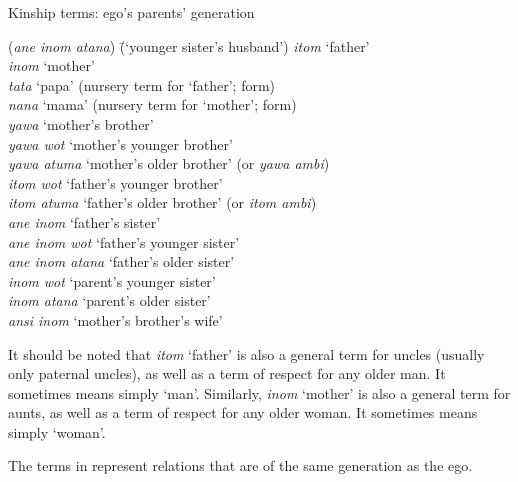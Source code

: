 \ea%
    \label{ex:sem:26}
          Kinship terms: ego’s parents’ generation
\begin{tabbing}
      {(\textit{ane inom atana})} \= {(‘younger sister’s husband’)}\kill
     \textit{itom} \> ‘father’\\
     \textit{inom} \> ‘mother’\\
     \textit{tata} \> ‘papa’ (nursery term for ‘father’;  form)\\
    \textit{nana} \> ‘mama’ (nursery term for ‘mother’;  form)\\
    \textit{yawa} \> ‘mother’s brother’\\
    \textit{yawa wot} \> ‘mother’s younger brother’\\
    \textit{yawa atuma} \> ‘mother’s older brother’ (or \textit{yawa ambi})\\
    \textit{itom wot} \> ‘father’s younger brother’\\
    \textit{itom atuma} \> ‘father’s older brother’ (or \textit{itom ambi})\\
    \textit{ane inom} \> ‘father’s sister’\\
    \textit{ane inom wot} \> ‘father’s younger sister’\\
    \textit{ane inom atana} \> ‘father’s older sister’\\
    \textit{inom wot} \> ‘parent’s younger sister’\\
    \textit{inom atana} \> ‘parent’s older sister’\\
    \textit{ansi inom} \> ‘mother’s brother’s wife’
\end{tabbing}
\z

It should be noted that \textit{itom} ‘father’ is also a general term for uncles (usually only paternal uncles), as well as a term of respect for any older man. It sometimes means simply ‘man’. Similarly, \textit{inom} ‘mother’ is also a general term for aunts, as well as a term of respect for any older woman. It sometimes means simply ‘woman’.

The terms in  represent relations that are of the same generation as the ego.

